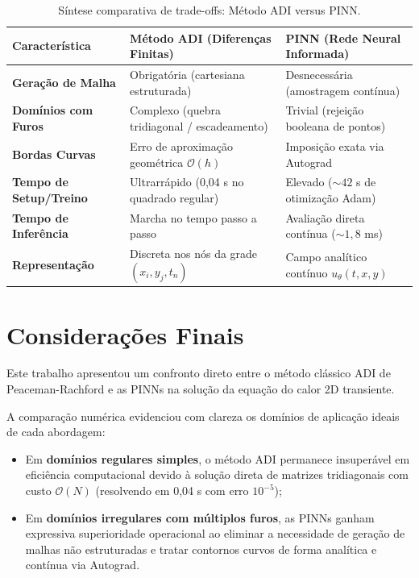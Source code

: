 \documentclass[11pt,a4paper]{article}
\begin{document}
\begin{table}[htbp]
\centering
\small
\caption{Síntese comparativa de trade-offs: Método ADI versus PINN.}
\label{tab:comparison}
\begin{tabular}{@{}p{3.8cm}p{5.8cm}p{6.0cm}@{}}
\toprule
\textbf{Característica} & \textbf{Método ADI (Diferenças Finitas)} & \textbf{PINN (Rede Neural Informada)} \\ \midrule
\textbf{Geração de Malha} & Obrigatória (cartesiana estruturada) & Desnecessária (amostragem contínua) \\
\textbf{Domínios com Furos} & Complexo (quebra tridiagonal / escadeamento) & Trivial (rejeição booleana de pontos) \\
\textbf{Bordas Curvas} & Erro de aproximação geométrica $\mathcal{O}(h)$ & Imposição exata via Autograd \\
\textbf{Tempo de Setup/Treino} & Ultrarrápido (0,04 s no quadrado regular) & Elevado ($\sim 42$ s de otimização Adam) \\
\textbf{Tempo de Inferência} & Marcha no tempo passo a passo & Avaliação direta contínua ($\sim 1{,}8$ ms) \\
\textbf{Representação} & Discreta nos nós da grade $(x_i, y_j, t_n)$ & Campo analítico contínuo $u_\theta(t, x, y)$ \\ \bottomrule
\end{tabular}
\end{table}

\section{Considerações Finais}

Este trabalho apresentou um confronto direto entre o método clássico ADI de Peaceman-Rachford e as PINNs na solução da equação do calor 2D transiente. 

A comparação numérica evidenciou com clareza os domínios de aplicação ideais de cada abordagem:
\begin{itemize}
  \item Em \textbf{domínios regulares simples}, o método ADI permanece insuperável em eficiência computacional devido à solução direta de matrizes tridiagonais com custo $\mathcal{O}(N)$ (resolvendo em 0,04 s com erro $10^{-5}$);
  \item Em \textbf{domínios irregulares com múltiplos furos}, as PINNs ganham expressiva superioridade operacional ao eliminar a necessidade de geração de malhas não estruturadas e tratar contornos curvos de forma analítica e contínua via Autograd.
\end{itemize}
\end{document}
